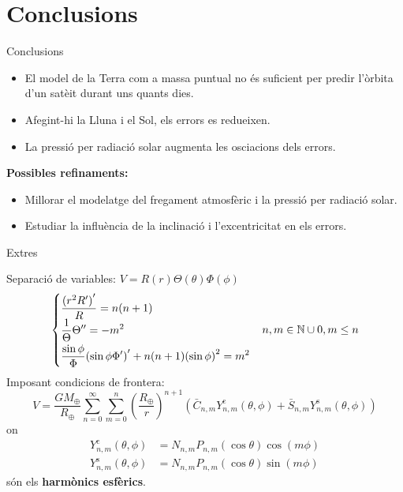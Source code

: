 \documentclass{beamer} %
\begin{document}
\section{Conclusions}
\begin{frame}{Conclusions}
  \begin{itemize}
    \item El model de la Terra com a massa puntual no és suficient per predir l'òrbita d'un satè\lgem it durant uns quants dies.
    \item Afegint-hi la Lluna i el Sol, els errors es redueixen.
    \item La pressió per radiació solar augmenta les osci\lgem acions dels errors.
  \end{itemize}
  \vspace{0.5cm}\pause
  \textbf{Possibles refinaments:}
  \begin{itemize}
    \item Millorar el modelatge del fregament atmosfèric i la pressió per radiació solar.
    \item Estudiar la influència de la inclinació i l'excentricitat en els errors.
  \end{itemize}
\end{frame}
\begin{frame}{Extres}

\end{frame}
\begin{frame}
  Separació de variables: $V=R(r)\Theta(\theta)\Phi(\phi)$
  \begin{gather*}
    \begin{cases}
      \displaystyle\frac{{(r^2R')}'}{R}=n(n+1)                  \\
      \displaystyle\frac{1}{\Theta}\Theta'' =-m^2\vspace{0.1cm} \\
      \displaystyle\frac{\sin\phi}{\Phi}{(\sin\phi\Phi')}'+n(n+1){(\sin\phi)}^2 =m^2
    \end{cases}\!n,m\in\NN\cup{0}, m\leq n
  \end{gather*}\pause
  Imposant condicions de frontera:
  \begin{equation*}
    V =\frac{GM_\oplus}{R_\oplus}\sum_{n=0}^\infty \sum_{m=0}^n{\left(\frac{{R_\oplus}}{r}\right)}^{n+1}(\bar{C}_{n,m}Y_{n,m}^{\mathrm{c}}(\theta,\phi)+\bar{S}_{n,m}Y_{n,m}^{\mathrm{s}}(\theta,\phi))
  \end{equation*}
  on
  \begin{align*}
    Y_{n,m}^{\mathrm{c}}(\theta,\phi) & =N_{n,m}P_{n,m}(\cos\theta)\cos(m\phi) \\
    Y_{n,m}^{\mathrm{s}}(\theta,\phi) & =N_{n,m}P_{n,m}(\cos\theta)\sin(m\phi)
  \end{align*}
  són els \textbf{harmònics esfèrics}.
\end{frame}
\end{document}
